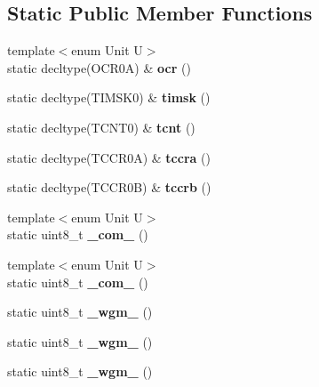 \subsection*{Static Public Member Functions}
\begin{DoxyCompactItemize}
\item 
\hypertarget{struct__timer_1_1Timer0_ad16cd0120c36c36004d17e028818c593}{}\label{struct__timer_1_1Timer0_ad16cd0120c36c36004d17e028818c593} 
{\footnotesize template$<$enum Unit U$>$ }\\static decltype(O\+C\+R0A) \& {\bfseries ocr} ()
\item 
\hypertarget{struct__timer_1_1Timer0_a6f5e3922897bf39dd7aab85a80b134ea}{}\label{struct__timer_1_1Timer0_a6f5e3922897bf39dd7aab85a80b134ea} 
static decltype(T\+I\+M\+S\+K0) \& {\bfseries timsk} ()
\item 
\hypertarget{struct__timer_1_1Timer0_a176eaf59c3fcc1324a94d3e984b7f888}{}\label{struct__timer_1_1Timer0_a176eaf59c3fcc1324a94d3e984b7f888} 
static decltype(T\+C\+N\+T0) \& {\bfseries tcnt} ()
\item 
\hypertarget{struct__timer_1_1Timer0_afa3bb72ce004ad71dfbbbe922eb09ce7}{}\label{struct__timer_1_1Timer0_afa3bb72ce004ad71dfbbbe922eb09ce7} 
static decltype(T\+C\+C\+R0A) \& {\bfseries tccra} ()
\item 
\hypertarget{struct__timer_1_1Timer0_ad195062da01e2a664ec13f96b77b1060}{}\label{struct__timer_1_1Timer0_ad195062da01e2a664ec13f96b77b1060} 
static decltype(T\+C\+C\+R0B) \& {\bfseries tccrb} ()
\item 
\hypertarget{struct__timer_1_1Timer0_a7f9486e19779260a5c95847123b3e551}{}\label{struct__timer_1_1Timer0_a7f9486e19779260a5c95847123b3e551} 
{\footnotesize template$<$enum Unit U$>$ }\\static uint8\+\_\+t {\bfseries \+\_\+com\+\_} ()
\item 
\hypertarget{struct__timer_1_1Timer0_ab69def1d0b4d99d88c3a1d8889166d91}{}\label{struct__timer_1_1Timer0_ab69def1d0b4d99d88c3a1d8889166d91} 
{\footnotesize template$<$enum Unit U$>$ }\\static uint8\+\_\+t {\bfseries \+\_\+com\+\_} ()
\item 
\hypertarget{struct__timer_1_1Timer0_a379fca503406283d96ff5affb0ccfe84}{}\label{struct__timer_1_1Timer0_a379fca503406283d96ff5affb0ccfe84} 
static uint8\+\_\+t {\bfseries \+\_\+wgm\+\_} ()
\item 
\hypertarget{struct__timer_1_1Timer0_addf299a7c98854171c4a5256203924b0}{}\label{struct__timer_1_1Timer0_addf299a7c98854171c4a5256203924b0} 
static uint8\+\_\+t {\bfseries \+\_\+wgm\+\_} ()
\item 
\hypertarget{struct__timer_1_1Timer0_a49ffd95e7b493ca47fad2dd896c9ec7d}{}\label{struct__timer_1_1Timer0_a49ffd95e7b493ca47fad2dd896c9ec7d} 
static uint8\+\_\+t {\bfseries \+\_\+wgm\+\_} ()
\end{DoxyCompactItemize}
